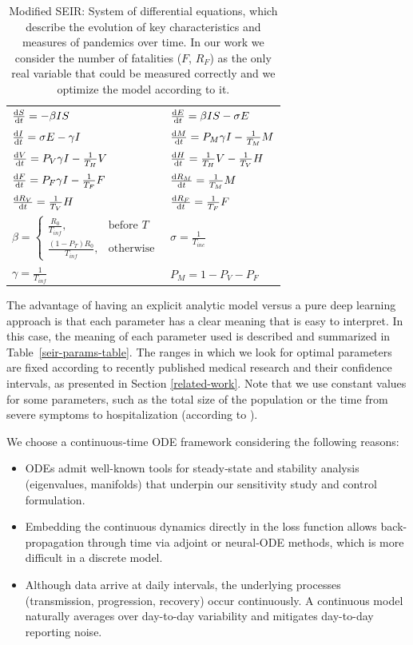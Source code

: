\documentclass[11pt]{article}
\begin{document}
\begin{table}[H]
  \caption{Modified SEIR: System of differential equations, which describe the evolution of key characteristics and measures of pandemics over time. In our work we consider the number of fatalities ($F$, $R_F$) as the only real variable that could be measured correctly and we optimize the model according to it.}
  \label{seir-eqs-table}
  \centering
  \renewcommand{\arraystretch}{2}
  \begin{tabular}{ll}
    $\dv{S}{t} = - \beta I S$ & $\dv{E}{t} = \beta I S - \sigma E$ \\
    $\dv{I}{t} = \sigma E - \gamma I$ & $\dv{M}{t} = P_M \gamma I - \frac{1}{T_M} M$ \\
    $\dv{V}{t} = P_V \gamma I - \frac{1}{T_H} V$ & $\dv{H}{t} = \frac{1}{T_H} V - \frac{1}{T_V} H$ \\
    $\dv{F}{t} = P_F \gamma I - \frac{1}{T_F} F$ & $\dv{R_M}{t} = \frac{1}{T_M} M$ \\
    $\dv{R_V}{t} = \frac{1}{T_V} H$ & $\dv{R_F}{t} = \frac{1}{T_F} F$ \\
    $\beta = 
    \begin{cases}
        \frac{R_0}{T_{inf}}, & \text{before } T\\
        \frac{(1-P_T) R_0}{T_{inf}}, & \text{otherwise}
    \end{cases}$ & $\sigma = \frac{1}{T_{inc}}$ \\
    $\gamma = \frac{1}{T_{inf}}$ & $P_M = 1 - P_V - P_F$ \\
  \end{tabular}
\end{table}

The advantage of having an explicit analytic model versus a pure deep learning approach
is that each parameter has a clear meaning that is easy to interpret. 
In this case, the meaning of each parameter used is described and summarized in Table~\ref{seir-params-table}. The ranges in which we look for optimal parameters are fixed according to recently published medical research and their confidence intervals, as presented in Section \ref{related-work}. Note that we use constant values for some parameters, such as the total size of the population or the time from severe symptoms to hospitalization (according to \cite{gabgoh}).


We choose a continuous‐time ODE framework considering the following reasons:

\begin{itemize}
    \item ODEs admit well-known tools for steady‐state and stability analysis (eigenvalues, manifolds) that underpin our sensitivity study and control formulation.
    \item Embedding the continuous dynamics directly in the loss function allows back-propagation through time via adjoint or neural-ODE methods, which is more difficult in a discrete model.
    \item Although data arrive at daily intervals, the underlying processes (transmission, progression, recovery) occur continuously. A continuous model naturally averages over day-to-day variability and mitigates day-to-day reporting noise.
\end{itemize}
\end{document}
